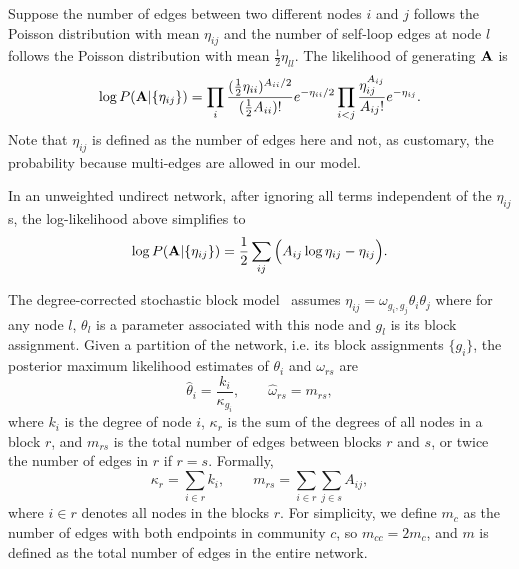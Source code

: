 Suppose the number of edges between two different nodes $i$ and $j$ follows the Poisson distribution with mean $\eta_{ij}$ and the number of self-loop edges at node $l$ follows the Poisson distribution with mean $\frac{1}{2}\eta_{ll}$. The likelihood of generating $\bf A$ is
\begin{equation} \label{eq:ll0}
    \log P({\bf A}|\{\eta_{ij}\}) = \prod_{i} \frac{(\frac{1}{2}\eta_{ii})^{A_{ii}/2} }{(\frac{1}{2}A_{ii})!} e^{-\eta_{ii}/2} \prod_{i<j} \frac{\eta_{ij}^{A_{ij}} }{A_{ij}!} e^{- \eta_{ij}}.
\end{equation}
Note that $\eta_{ij}$ is defined as the number of edges here and not, as customary, the probability because multi-edges are allowed in our model.

In an unweighted undirect network, after ignoring all terms independent of the $\eta_{ij}$s, the log-likelihood above simplifies to
\begin{equation} \label{eq:ll}
    \log P({\bf A}|\{\eta_{ij}\}) = \frac{1}{2} \sum_{ij} \Big(A_{ij} \log \eta_{ij} - \eta_{ij} \Big).
\end{equation}

The degree-corrected stochastic block model~\cite{karrer2011stochastic} assumes $\eta_{ij} = \omega_{g_i,g_j} \theta_i \theta_j$ where for any  node $l$, $\theta_l$ is a parameter associated with this node and $g_l$ is its block assignment. Given a partition of the network, i.e. its block assignments $\{g_i\}$, the posterior maximum likelihood estimates of $\theta_i$ and $\omega_{rs}$ are 
\begin{equation}
    \hat{\theta}_i = \frac{k_i}{\kappa_{g_i}}, \quad \quad \hat{\omega}_{rs} = m_{rs},
\end{equation}
where $k_i$ is the degree of node $i$, $\kappa_{r}$ is the sum of the degrees of all nodes in a block $r$, and $m_{rs}$ is the total number of edges between blocks $r$ and $s$, or twice the number of edges in $r$ if $r=s$. Formally,
\begin{equation} \label{eq:number_edges}
    \kappa_r = \sum_{i\in r} k_i, \quad \quad m_{rs} = \sum_{i\in r} \sum_{j\in s} A_{ij},
\end{equation}
where $i\in r$ denotes all nodes in the blocks $r$. For simplicity, we define $m_c$ as the number of edges with both endpoints in community $c$, so $m_{cc} = 2m_c$, and $m$ is defined as the total number of edges in the entire network.

